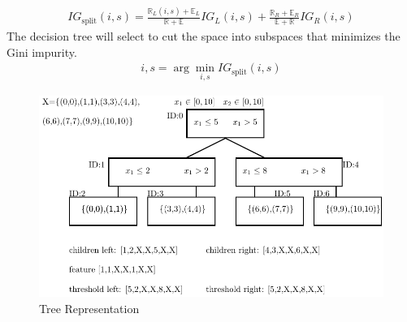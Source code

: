 \documentclass[11pt,onecolumn]{IEEEtran}
\begin{document}
\begin{align*}
IG_{\mbox{split}}(i,s)=\frac{\mathbb R_L(i,s)+\mathbb E_L}{\mathbb R+ \mathbb E}IG_L(i,s)+\frac{\mathbb R_R+ \mathbb E_R}{\mathbb E+\mathbb R}IG_R(i,s)
\end{align*}
The decision tree will select to cut the space into subspaces  that minimizes the  Gini impurity.
\begin{align*}
i,s=\arg \min_{i,s} IG_{\mbox{split}}(i,s)
\end{align*}

  \begin{figure}[h]
    \centering
    \includegraphics[scale=1]{image/tree.pdf} 
    \caption{Tree Representation}
    \label{fig:ExampleTree1}
    \end{figure}
\end{document}
